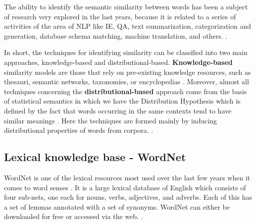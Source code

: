 
The ability to identify the semantic similarity between words has been a subject of research very explored in the last years, because it is related to a series of activities of the area of NLP like IE, QA, text summarization, categorization and generation, database schema matching, machine translation, and others. \cite{Islam2007ApplicationsOC, Jurafsky:2009:SLP:1214993}. 

In short, the techniques for identifying similarity can be classified into two main approaches, knowledge-based and distributional-based. \textbf{Knowledge-based} similarity models are those that rely on pre-existing knowledge resources, such as thesauri, semantic networks, taxonomies, or encyclopedias \cite{Agirre2009}. Moreover, almost all techniques concerning the \textbf{distributional-based} approach come from the basis of statistical semantics in which we have the Distribution Hypothesis which is defined by the fact that words occurring in the same contexts tend to have similar meanings \cite{Harris1954}. Here the techniques are formed mainly by inducing distributional properties of words from corpora. \cite{Agirre2009}.

\subsection{Lexical knowledge base - WordNet}\label{chap:background:wordnet}

WordNet is one of the lexical resources most used over the last few years when it comes to word senses \cite{fellbaum1998}. It is a large lexical database of English which consists of four sub-nets, one each for nouns, verbs, adjectives, and adverbs. Each of this has a set of lemmas annotated with a set of synonyms. WordNet can either be downloaded for free or accessed via the web. \cite{wordnetOnline2010}.

